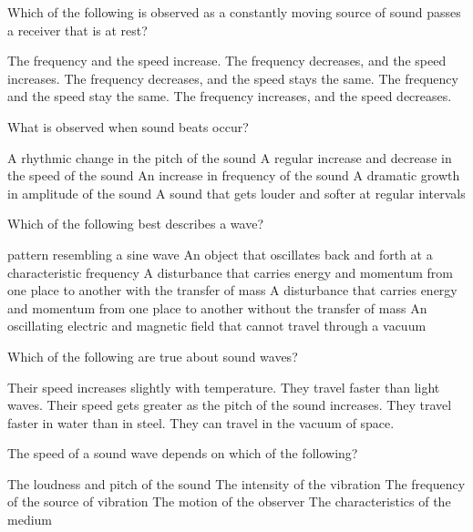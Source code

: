 \documentclass{../../../oss-ap12ibhl-print}
\begin{document}
\begin{questions}
  \question Which of the following is observed as a constantly moving source of
  sound passes a receiver that is at rest?
  \begin{choices}
    \choice The frequency and the speed increase.
    \choice The frequency decreases, and the speed increases.
    \choice The frequency decreases, and the speed stays the same.
    \choice The frequency and the speed stay the same.
    \choice The frequency increases, and the speed decreases.
  \end{choices}
  \newpage
  
  \question What is observed when sound beats occur?
  \begin{choices}
    \choice A rhythmic change in the pitch of the sound
    \choice A regular increase and decrease in the speed of the sound
    \choice An increase in frequency of the sound
    \choice A dramatic growth in amplitude of the sound
    \choice A sound that gets louder and softer at regular intervals
    \end{choices}
    
  \question Which of the following best describes a wave?
  \begin{choices}
    \choice pattern resembling a sine wave
    \choice An object that oscillates back and forth at a characteristic
    frequency
    \choice A disturbance that carries energy and momentum from one place to
    another with the transfer of mass
    \choice A disturbance that carries energy and momentum from one place to
    another without the transfer of mass
    \choice An oscillating electric and magnetic field that cannot travel
    through a vacuum
  \end{choices}
    
  \question Which of the following are true about sound waves?
  \label{multi-1st}
  \begin{choices}
    \choice Their speed increases slightly with temperature.
    \choice They travel faster than light waves.
    \choice Their speed gets greater as the pitch of the sound increases.
    \choice They travel faster in water than in steel.
    \choice They can travel in the vacuum of space.
  \end{choices}
    
  \question The speed of a sound wave depends on which of the following?
  \begin{choices}
    \choice The loudness and pitch of the sound
    \choice The intensity of the vibration
    \choice The frequency of the source of vibration
    \choice The motion of the observer
    \choice The characteristics of the medium
  \end{choices}
    

\end{questions}
\end{document}
